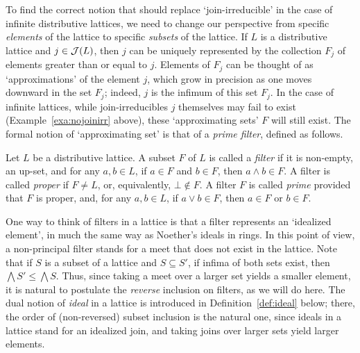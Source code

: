 To find the correct notion that should replace `join-irreducible' in the case of infinite distributive lattices, we need to change our perspective from specific \emph{elements} of the lattice to specific \emph{subsets} of the lattice. If $L$ is a distributive lattice and $j \in \mathcal{J}(L)$, then $j$ can be uniquely represented by the collection $F_j$ of elements greater than or equal to $j$. Elements of $F_j$ can be thought of as `approximations' of the element $j$, which grow in precision as one moves downward in the set $F_j$; indeed, $j$ is the infimum of this set $F_j$. In the case of infinite lattices, while join-irreducibles $j$ themselves may fail to exist (Example~\ref{exa:nojoinirr} above), these `approximating sets' $F$ will still exist. The formal notion of `approximating set' is that of a \emph{prime filter}, defined as follows.
\begin{definition}
Let $L$ be a distributive lattice. A subset $F$ of $L$ is called a \emph{filter} if it is non-empty, an up-set, and for any $a, b \in L$, if $a \in F$ and $b \in F$, then $a \wedge b \in F$. A filter is called \emph{proper} if $F \neq L$, or, equivalently, $\bot \not\in F$. A filter $F$ is called \emph{prime} provided that $F$ is proper, and, for any $a, b \in L$, if $a \vee b \in F$, then $a \in F$ or $b \in F$.
\end{definition}
One way to think of filters in a lattice is that a filter represents an `idealized element', in much the same way as Noether's ideals in rings. In this point of view, a non-principal filter stands for a meet that does not exist in the lattice. Note that if $S$ is a subset of a lattice and $S \subseteq S'$, if infima of both sets exist, then $\bigwedge S' \leq \bigwedge S$. Thus, since taking a meet over a larger set yields a smaller element, it is natural to postulate the \emph{reverse} inclusion on filters, as we will do here. The dual notion of \emph{ideal} in a lattice is introduced in Definition~\ref{def:ideal} below; there, the order of (non-reversed) subset inclusion is the natural one, since ideals in a lattice stand for an idealized join, and taking joins over larger sets yield larger elements.


